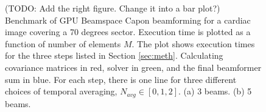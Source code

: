 \documentclass[journal]{IEEEtran}
\begin{document}
\begin{figure}[!t]
\centerline{
\hfil
{}}
\caption{(TODO: Add the right figure. Change it into a bar plot?) Benchmark of GPU Beamspace Capon beamforming for a cardiac image covering a 70 degrees sector. Execution time is plotted as a function of number of elements $M$. The plot shows execution times for the three steps listed in Section \ref{sec:meth}. Calculating covariance matrices in red, solver in green, and the final beamformer sum in blue. For each step, there is one line for three different choices of temporal averaging, $N_{avg} \in [0, 1, 2]$. (a) 3 beams. (b) 5 beams.}
\label{fig:benchBS}
\end{figure}
\end{document}
